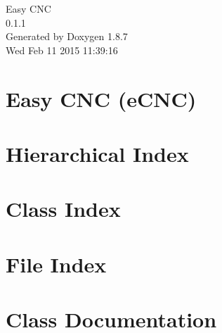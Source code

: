 \documentclass[twoside]{book}
\newcommand{\+}{\discretionary{\mbox{\scriptsize$\hookleftarrow$}}{}{}}
\newcommand{\clearemptydoublepage}{%
  \newpage{\pagestyle{empty}\cleardoublepage}%
}
\begin{document}
\hypersetup{pageanchor=false,
             bookmarks=true,
             bookmarksnumbered=true,
             pdfencoding=unicode
            }
\begin{titlepage}
\vspace*{7cm}
\begin{center}%
{\Large Easy C\+N\+C \\[1ex]\large 0.\+1.\+1 }\\
\vspace*{1cm}
{\large Generated by Doxygen 1.8.7}\\
\vspace*{0.5cm}
{\small Wed Feb 11 2015 11:39:16}\\
\end{center}
\end{titlepage}
\clearemptydoublepage
\tableofcontents
\clearemptydoublepage
{}
\hypersetup{pageanchor=true}

\chapter{Easy C\+N\+C (e\+C\+N\+C)}
\label{index}\hypertarget{index}{}
\chapter{Hierarchical Index}

\chapter{Class Index}

\chapter{File Index}

\chapter{Class Documentation}


















\end{document}
